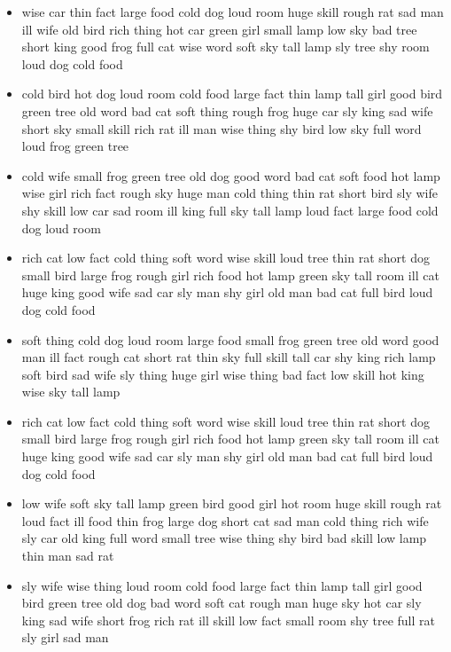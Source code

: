 \documentclass[11pt,a4wide]{article}
\begin{document}
\begin{itemize}
  \item wise car thin fact large food cold dog loud room huge skill
    rough rat sad man ill wife old bird rich thing hot car green girl
    small lamp low sky bad tree short king good frog full cat wise
    word soft sky tall lamp sly tree shy room loud dog cold food

  \item cold bird hot dog loud room cold food large fact thin lamp
    tall girl good bird green tree old word bad cat soft thing rough
    frog huge car sly king sad wife short sky small skill rich rat ill
    man wise thing shy bird low sky full word loud frog green tree

  \item cold wife small frog green tree old dog good word bad cat soft
    food hot lamp wise girl rich fact rough sky huge man cold thing
    thin rat short bird sly wife shy skill low car sad room ill king
    full sky tall lamp loud fact large food cold dog loud room

  \item rich cat low fact cold thing soft word wise skill loud tree
    thin rat short dog small bird large frog rough girl rich food hot
    lamp green sky tall room ill cat huge king good wife sad car sly
    man shy girl old man bad cat full bird loud dog cold food

  \item soft thing cold dog loud room large food small frog green tree
    old word good man ill fact rough cat short rat thin sky full skill
    tall car shy king rich lamp soft bird sad wife sly thing huge girl
    wise thing bad fact low skill hot king wise sky tall lamp

  \item rich cat low fact cold thing soft word wise skill loud tree
    thin rat short dog small bird large frog rough girl rich food hot
    lamp green sky tall room ill cat huge king good wife sad car sly
    man shy girl old man bad cat full bird loud dog cold food

  \item low wife soft sky tall lamp green bird good girl hot room huge
    skill rough rat loud fact ill food thin frog large dog short cat
    sad man cold thing rich wife sly car old king full word small tree
    wise thing shy bird bad skill low lamp thin man sad rat

  \item sly wife wise thing loud room cold food large fact thin lamp
    tall girl good bird green tree old dog bad word soft cat rough man
    huge sky hot car sly king sad wife short frog rich rat ill skill
    low fact small room shy tree full rat sly girl sad man


\end{itemize}
\end{document}
